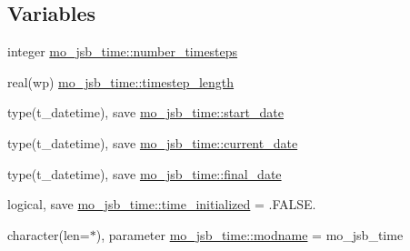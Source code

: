 \subsection*{Variables}
\begin{DoxyCompactItemize}
\item 
integer \hyperlink{namespacemo__jsb__time_ab33d9e53cde817560aa3730633ea1413}{mo\+\_\+jsb\+\_\+time\+::number\+\_\+timesteps}
\item 
real(wp) \hyperlink{namespacemo__jsb__time_ad760ff14bc3e4b8e9d624706973ee1a4}{mo\+\_\+jsb\+\_\+time\+::timestep\+\_\+length}
\item 
type(t\+\_\+datetime), save \hyperlink{namespacemo__jsb__time_afa7b526c3dff7e0c063d6545e6eae499}{mo\+\_\+jsb\+\_\+time\+::start\+\_\+date}
\item 
type(t\+\_\+datetime), save \hyperlink{namespacemo__jsb__time_a1a0e4eb7d850630c29d3e80a77cac78b}{mo\+\_\+jsb\+\_\+time\+::current\+\_\+date}
\item 
type(t\+\_\+datetime), save \hyperlink{namespacemo__jsb__time_a6ee919b8447b1554b208420eb0760e95}{mo\+\_\+jsb\+\_\+time\+::final\+\_\+date}
\item 
logical, save \hyperlink{namespacemo__jsb__time_ac404f6055d48b37e7de92b0e288f5a8c}{mo\+\_\+jsb\+\_\+time\+::time\+\_\+initialized} = .F\+A\+L\+S\+E.
\item 
character(len=$\ast$), parameter \hyperlink{namespacemo__jsb__time_a44d3acf17e06ee576cf456b9fa721952}{mo\+\_\+jsb\+\_\+time\+::modname} = \textquotesingle{}mo\+\_\+jsb\+\_\+time\textquotesingle{}
\end{DoxyCompactItemize}
